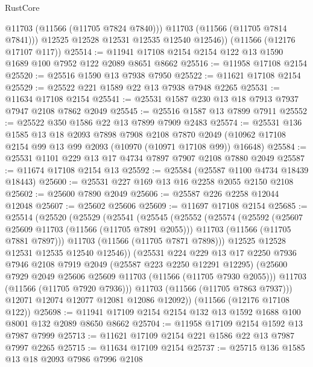 \begin{lexlean}{RustCore}
\begin{coremodule}
            @11703
            (@11566 (@11705 @7824 @7840)))
          @11703
          (@11566 (@11705 @7814 @7841)))
        @12525
        @12528
        @12531
        @12535
        @12540
        @12546))
    (@11566 (@12176 @17107 @117))
@25514 := @11941 @17108 @2154 @2154 @122 @13 @1590 @1689 @100 @7952 @122 @2089 @8651 @8662
@25516 := @11958 @17108 @2154
@25520 := @25516 @1590 @13 @7938 @7950
@25522 := @11621 @17108 @2154
@25529 := @25522 @221 @1589 @22 @13 @7938 @7948 @2265
@25531 := @11634 @17108 @2154
@25541 := @25531 @1587 @230 @13 @18 @7913 @7937 @7947 @2108 @7862 @2049
@25545 := @25516 @1587 @13 @7899 @7911
@25552 := @25522 @350 @1586 @22 @13 @7899 @7909 @2483
@25574 := @25531
    @136
    @1585
    @13
    @18
    @2093
    @7898
    @7908
    @2108
    @7870
    @2049
    (@10962 @17108 @2154 @99 @13 @99 @2093 (@10970 (@10971 @17108 @99)) @16648)
@25584 := @25531 @1101 @229 @13 @17 @4734 @7897 @7907 @2108 @7880 @2049
@25587 := @11674 @17108 @2154 @13
@25592 := @25584 (@25587 @1100 @4734 @18439 @18443)
@25600 := @25531 @227 @169 @13 @16 @2258 @2055 @2150 @2108
@25602 := @25600 @7890 @2049
@25606 := @25587 @226 @2258 @12044 @12048
@25607 := @25602 @25606
@25609 := @11697 @17108 @2154
@25685 := @25514
    (@25520
      (@25529
        (@25541
          (@25545
            (@25552
              (@25574
                (@25592
                  (@25607 @25609 @11703 (@11566 (@11705 @7891 @2055)))
                  @11703
                  (@11566 (@11705 @7881 @7897)))
                @11703
                (@11566 (@11705 @7871 @7898)))
              @12525
              @12528
              @12531
              @12535
              @12540
              @12546))
          (@25531
            @224
            @229
            @13
            @17
            @2250
            @7936
            @7946
            @2108
            @7919
            @2049
            (@25587 @223 @2250 @12291 @12295)
            (@25600 @7929 @2049 @25606 @25609 @11703 (@11566 (@11705 @7930 @2055)))
            @11703
            (@11566 (@11705 @7920 @7936)))
          @11703
          (@11566 (@11705 @7863 @7937)))
        @12071
        @12074
        @12077
        @12081
        @12086
        @12092))
    (@11566 (@12176 @17108 @122))
@25698 := @11941 @17109 @2154 @2154 @132 @13 @1592 @1688 @100 @8001 @132 @2089 @8650 @8662
@25704 := @11958 @17109 @2154 @1592 @13 @7987 @7999
@25713 := @11621 @17109 @2154 @221 @1586 @22 @13 @7987 @7997 @2265
@25715 := @11634 @17109 @2154
@25737 := @25715
    @136
    @1585
    @13
    @18
    @2093
    @7986
    @7996
    @2108

\end{coremodule}
\end{lexlean}
